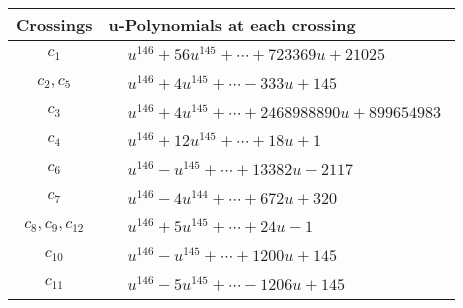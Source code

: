\documentclass[1p]{elsarticle_modified}
\theoremstyle{definition}
\begin{document}
\begin{tabular}{m{50pt}|m{274pt}}
Crossings & \hspace{64pt}u-Polynomials at each crossing \\
\hline $$\begin{aligned}c_{1}\end{aligned}$$&$\begin{aligned}
&u^{146}+56 u^{145}+\cdots+723369 u+21025
\end{aligned}$\\
\hline $$\begin{aligned}c_{2},c_{5}\end{aligned}$$&$\begin{aligned}
&u^{146}+4 u^{145}+\cdots-333 u+145
\end{aligned}$\\
\hline $$\begin{aligned}c_{3}\end{aligned}$$&$\begin{aligned}
&u^{146}+4 u^{145}+\cdots+2468988890 u+899654983
\end{aligned}$\\
\hline $$\begin{aligned}c_{4}\end{aligned}$$&$\begin{aligned}
&u^{146}+12 u^{145}+\cdots+18 u+1
\end{aligned}$\\
\hline $$\begin{aligned}c_{6}\end{aligned}$$&$\begin{aligned}
&u^{146}- u^{145}+\cdots+13382 u-2117
\end{aligned}$\\
\hline $$\begin{aligned}c_{7}\end{aligned}$$&$\begin{aligned}
&u^{146}-4 u^{144}+\cdots+672 u+320
\end{aligned}$\\
\hline $$\begin{aligned}c_{8},c_{9},c_{12}\end{aligned}$$&$\begin{aligned}
&u^{146}+5 u^{145}+\cdots+24 u-1
\end{aligned}$\\
\hline $$\begin{aligned}c_{10}\end{aligned}$$&$\begin{aligned}
&u^{146}- u^{145}+\cdots+1200 u+145
\end{aligned}$\\
\hline $$\begin{aligned}c_{11}\end{aligned}$$&$\begin{aligned}
&u^{146}-5 u^{145}+\cdots-1206 u+145
\end{aligned}$\\
\hline
\end{tabular}\\~\\
\end{document}

